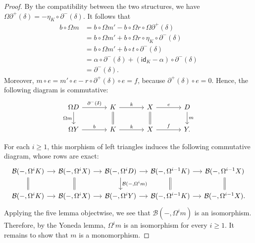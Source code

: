 \documentclass[a4paper,reqno,10pt]{amsart}
\theoremstyle{definition}
\theoremstyle{definition}
\theoremstyle{definition}
\theoremstyle{definition}
\theoremstyle{plain}
\newcommand{\id}{\mathsf{id}}
\newcommand{\CB}{\mathcal{B}}
\begin{document}
\begin{proof}
By the compatibility between the two structures, we have $\Omega\partial^+(\delta)=-\eta_K\circ\partial^-(\delta)$.
It follows that
\begin{align*}
b\circ\Omega m
&=
b\circ\Omega m'
-b\circ\Omega r\circ\Omega\partial^+(\delta)\\
&=
b\circ\Omega m'
+b\circ\Omega r\circ\eta_K\circ\partial^-(\delta)\\
&=
b\circ\Omega m'
+b\circ t\circ\partial^-(\delta)\\
&=
\alpha\circ\partial^-(\delta)
+(\id_K-\alpha)\circ\partial^-(\delta)\\
&=
\partial^-(\delta).
\end{align*}
Moreover, $m\circ e=m'\circ e-r\circ\partial^+(\delta)\circ e=f$, because $\partial^+(\delta)\circ e=0$. Hence, the following diagram is commutative:
\[
\begin{tikzcd}[column sep=large]
\Omega D
  \arrow[r,"\partial^-(\delta)"]
  \arrow[d,"\Omega m"']
&
K
  \arrow[r,"k"]
  \arrow[d,equal]
&
X
  \arrow[r,"e"]
  \arrow[d,equal]
&
D
  \arrow[d,"m"]
\\
\Omega Y
  \arrow[r,"b"]
&
K
  \arrow[r,"k"]
&
X
  \arrow[r,"f"]
&
Y.
\end{tikzcd}
\]

For each $i\geq1$, this morphism of left triangles induces the following commutative diagram, whose rows are exact:
\[
\begin{tikzcd}[column sep=small]
\CB(-,\Omega^iK)
  \arrow[r]
  \arrow[d,equal]
&
\CB(-,\Omega^iX)
  \arrow[r]
  \arrow[d,equal]
&
\CB(-,\Omega^iD)
  \arrow[r]
  \arrow[d,"{\CB(-,\Omega^im)}"]
&
\CB(-,\Omega^{i-1}K)
  \arrow[r]
  \arrow[d,equal]
&
\CB(-,\Omega^{i-1}X)
  \arrow[d,equal]
\\
\CB(-,\Omega^iK)
  \arrow[r]
&
\CB(-,\Omega^iX)
  \arrow[r]
&
\CB(-,\Omega^iY)
  \arrow[r]
&
\CB(-,\Omega^{i-1}K)
  \arrow[r]
&
\CB(-,\Omega^{i-1}X).
\end{tikzcd}
\]
Applying the five lemma objectwise, we see that $\CB(-,\Omega^im)$ is an isomorphism. 
Therefore, by the Yoneda lemma, $\Omega^im$ is an isomorphism for every $i\geq1$. It remains to show that $m$ is a monomorphism.


\end{proof}
\end{document}
